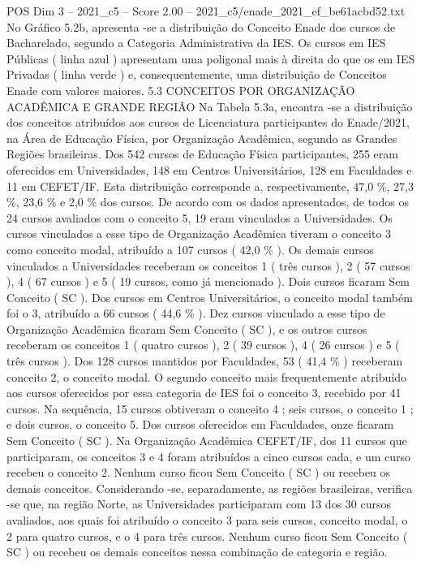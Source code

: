 \begin{textsample}{POS Dim 3 – 2021\_c5 – Score 2.00 – 2021\_c5/enade\_2021\_ef\_be61acbd52.txt}
No Gráfico 5.2b, apresenta -se a distribuição do Conceito Enade dos cursos de Bacharelado, segundo a Categoria Administrativa da IES.
Os cursos em IES Públicas ( linha azul ) apresentam uma poligonal mais à direita do que os em IES Privadas ( linha verde ) e, consequentemente, uma distribuição de Conceitos Enade com valores maiores. 5.3 CONCEITOS POR ORGANIZAÇÃO ACADÊMICA E GRANDE REGIÃO Na Tabela 5.3a, encontra -se a distribuição dos conceitos atribuídos aos cursos de Licenciatura participantes do Enade/2021, na Área de Educação Física, por Organização Acadêmica, segundo as Grandes Regiões brasileiras.
Dos 542 cursos de Educação Física participantes, 255 eram oferecidos em Universidades, 148 em Centros Universitários, 128 em Faculdades e 11 em CEFET/IF.
Esta distribuição corresponde a, respectivamente, 47,0 \%, 27,3 \%, 23,6 \% e 2,0 \% dos cursos.
De acordo com os dados apresentados, de todos os 24 cursos avaliados com o conceito 5, 19 eram vinculados a Universidades.
Os cursos vinculados a esse tipo de Organização Acadêmica tiveram o conceito 3 como conceito modal, atribuído a 107 cursos ( 42,0 \% ).
Os demais cursos vinculados a Universidades receberam os conceitos 1 ( três cursos ), 2 ( 57 cursos ), 4 ( 67 cursos ) e 5 ( 19 cursos, como já mencionado ).
Dois cursos ficaram Sem Conceito ( SC ).
Dos cursos em Centros Universitários, o conceito modal também foi o 3, atribuído a 66 cursos ( 44,6 \% ).
Dez cursos vinculado a esse tipo de Organização Acadêmica ficaram Sem Conceito ( SC ), e os outros cursos receberam os conceitos 1 ( quatro cursos ), 2 ( 39 cursos ), 4 ( 26 cursos ) e 5 ( três cursos ).
Dos 128 cursos mantidos por Faculdades, 53 ( 41,4 \% ) receberam conceito 2, o conceito modal.
O segundo conceito mais frequentemente atribuído aos cursos oferecidos por essa categoria de IES foi o conceito 3, recebido por 41 cursos.
Na sequência, 15 cursos obtiveram o conceito 4 ; seis cursos, o conceito 1 ; e dois cursos, o conceito 5.
Dos cursos oferecidos em Faculdades, onze ficaram Sem Conceito ( SC ).
Na Organização Acadêmica CEFET/IF, dos 11 cursos que participaram, os conceitos 3 e 4 foram atribuídos a cinco cursos cada, e um curso recebeu o conceito 2.
Nenhum curso ficou Sem Conceito ( SC ) ou recebeu os demais conceitos.
Considerando -se, separadamente, as regiões brasileiras, verifica -se que, na região Norte, as Universidades participaram com 13 dos 30 cursos avaliados, aos quais foi atribuído o conceito 3 para seis cursos, conceito modal, o 2 para quatro cursos, e o 4 para três cursos.
Nenhum curso ficou Sem Conceito ( SC ) ou recebeu os demais conceitos nessa combinação de categoria e região.

\end{textsample}
